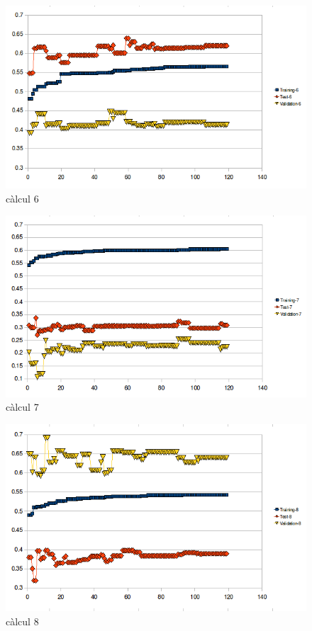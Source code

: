 \begin{figure}[h]
\begin{center}
\includegraphics[scale=0.75]{pholus/pholus6.png}
\end{center}
\caption{càlcul 6}
\label{fig:pholusResult6}
\end{figure}

\begin{figure}[h]
\begin{center}
\includegraphics[scale=0.75]{pholus/pholus7.png}
\end{center}
\caption{càlcul 7}
\label{fig:pholusResult7}
\end{figure}

\begin{figure}[h]
\begin{center}
\includegraphics[scale=0.75]{pholus/pholus8.png}
\end{center}
\caption{càlcul 8}
\label{fig:pholusResult8}
\end{figure}

